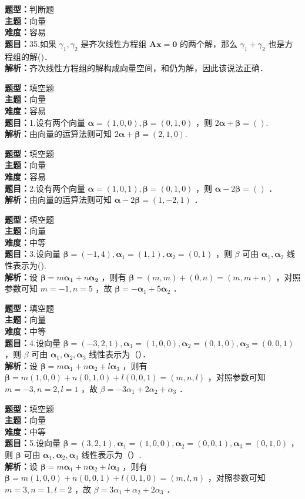 \documentclass{ctexart}
\newenvironment{question}[5]{%
	\noindent\textbf{题型：}#1\\
	\textbf{主题：}#2\\
	\textbf{难度：}#3\\
	\textbf{题目：}#4\\
	\textbf{解析：}#5\\
	\vspace{1em}
}{}
\begin{document}
	\begin{question}
		{判断题}
		{向量}
		{容易}
		{35.如果 \(\gamma_1, \gamma_2\) 是齐次线性方程组 \(\mathbf{Ax} = \mathbf{0}\) 的两个解，那么 \(\gamma_1 + \gamma_2\) 也是方程组的解(\qquad)．}
		{齐次线性方程组的解构成向量空间，和仍为解，因此该说法正确．}
	\end{question}
	
	
	
	
	\begin{question}
		{填空题}
		{向量}
		{容易}
		{1.设有两个向量 \(\boldsymbol{\alpha}=(1,0,0), \boldsymbol{\beta}=(0,1,0)\) ，则 \(2 \boldsymbol{\alpha}+\boldsymbol{\beta}=()\). }
		{由向量的运算法则可知 \(2 \boldsymbol{\alpha}+\boldsymbol{\beta}=(2,1,0)\). }
	\end{question}
	
	
	\begin{question}
		{填空题}
		{向量}
		{容易}
		{2.设有两个向量 \(\boldsymbol{\alpha}=(1,0,1), \boldsymbol{\beta}=(0,1,0)\) ，则 \(\boldsymbol{\alpha}-2 \boldsymbol{\beta}=()\) ．}
		{由向量的运算法则可知 \(\boldsymbol{\alpha}-2 \boldsymbol{\beta}=(1,-2,1)\) ．}
	\end{question}
	
	\begin{question}
		{填空题}
		{向量}
		{中等}
		{3.设向量 \(\boldsymbol{\beta}=(-1,4), \boldsymbol{\alpha}_1=(1,1), \boldsymbol{\alpha}_2=(0,1)\) ，则 \(\beta\) 可由 \(\boldsymbol{\alpha}_1, \boldsymbol{\alpha}_2\) 线性表示为(\qquad). }
		{设 \(\boldsymbol{\beta}=m \boldsymbol{\alpha}_{\mathbf{1}}+n \boldsymbol{\alpha}_{\mathbf{2}}\) ，则有 \(\boldsymbol{\beta}=(m, m)+(0, n)=(m, m+n)\) ，对照参数可知 \(m=-1, n=5\) ，故 \(\boldsymbol{\beta}=-\boldsymbol{\alpha}_1+5 \boldsymbol{\alpha}_2\) ．}
	\end{question}
	
	\begin{question}
		{填空题}
		{向量}
		{中等}
		{4.设向量 \(\boldsymbol{\beta}=(-3,2,1), \boldsymbol{\alpha}_1=(1,0,0), \boldsymbol{\alpha}_2=(0,1,0), \boldsymbol{\alpha}_3=(0,0,1)\) ，则 \(\beta\) 可由 \(\boldsymbol{\alpha}_1, \boldsymbol{\alpha}_2, \boldsymbol{\alpha}_3\) 线性表示为（）．}
		{设 \(\boldsymbol{\beta}=m \boldsymbol{\alpha}_1+n \boldsymbol{\alpha}_2+l \boldsymbol{\alpha}_3\) ，则有 \(\boldsymbol{\beta}=m(1,0,0)+n(0,1,0)+l(0,0,1)=(m, n, l)\) ，对照参数可知 \(m=-3, n=2, l=1\) ，故 \(\beta=-3 \alpha_1+2 \alpha_2+\alpha_3\) ．}
	\end{question}
	
	\begin{question}
		{填空题}
		{向量}
		{中等}
		{5.设向量 \(\boldsymbol{\beta}=(3,2,1), \boldsymbol{\alpha}_1=(1,0,0), \boldsymbol{\alpha}_2=(0,0,1), \boldsymbol{\alpha}_3=(0,1,0)\) ，则 \(\boldsymbol{\beta}\) 可由 \(\boldsymbol{\alpha}_1, \boldsymbol{\alpha}_2, \boldsymbol{\alpha}_3\) 线性表示为（）. }
		{设 \(\boldsymbol{\beta}=m \boldsymbol{\alpha}_{1}+n \boldsymbol{\alpha}_{2}+l \boldsymbol{\alpha}_3\) ，则有 \(\boldsymbol{\beta}=m(1,0,0)+n(0,0,1)+l(0,1,0)=(m, l, n)\) ，对照参数可知 \(m=3, n=1, l=2\) ，故 \(\beta=3 \alpha_1+\alpha_2+2 \alpha_3\) ．}
	\end{question}
	
\end{document}
